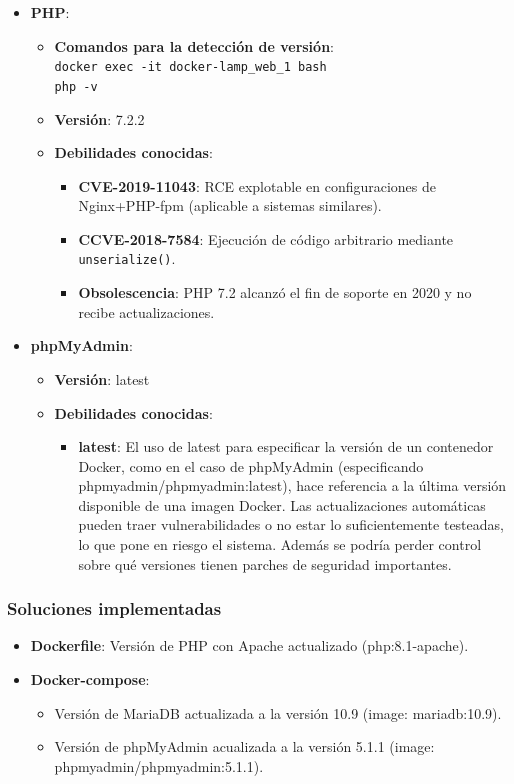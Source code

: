 \documentclass[a4paper,12pt]{article}
\newcommand{\code}[1]{\texttt{#1}}  %
\begin{document}
\begin{itemize}
	\item \textbf{PHP}: \begin{itemize}
		\item \textbf{Comandos para la detección de versión}:\\ \code{docker exec -it docker-lamp\_web\_1 bash} \\ \code{php -v}
		\item \textbf{Versión}: 7.2.2
		\item \textbf{Debilidades conocidas}: \begin{itemize}
			\item \textbf{CVE-2019-11043}: RCE explotable en configuraciones de Nginx+PHP-fpm (aplicable a sistemas similares).
			\item \textbf{CCVE-2018-7584}: Ejecución de código arbitrario mediante \code{unserialize()}.
			\item \textbf{Obsolescencia}: PHP 7.2 alcanzó el fin de soporte en 2020 y no recibe actualizaciones.
		\end{itemize}
	\end{itemize}
	
	\item \textbf{phpMyAdmin}: \begin{itemize}
		\item \textbf{Versión}: latest
		\item \textbf{Debilidades conocidas}: \begin{itemize}
			\item \textbf{latest}: El uso de latest para especificar la versión de un contenedor Docker, como en el caso de phpMyAdmin (especificando phpmyadmin/phpmyadmin:latest), hace referencia a la última versión disponible de una imagen Docker. Las actualizaciones automáticas pueden traer vulnerabilidades o no estar lo suficientemente testeadas, lo que pone en riesgo el sistema. Además se podría perder control sobre qué versiones tienen parches de seguridad importantes.
		\end{itemize}
	\end{itemize}
\end{itemize}
\subsubsection{Soluciones implementadas}
\begin{itemize}
	\item \textbf{Dockerfile}: Versión de PHP con Apache actualizado (php:8.1-apache).
	\item \textbf{Docker-compose}: \begin{itemize}
		\item Versión de MariaDB actualizada a la versión 10.9 (image: mariadb:10.9).
		\item Versión de phpMyAdmin acualizada a la versión 5.1.1 (image: phpmyadmin/phpmyadmin:5.1.1).
	\end{itemize}
\end{itemize}
\end{document}
